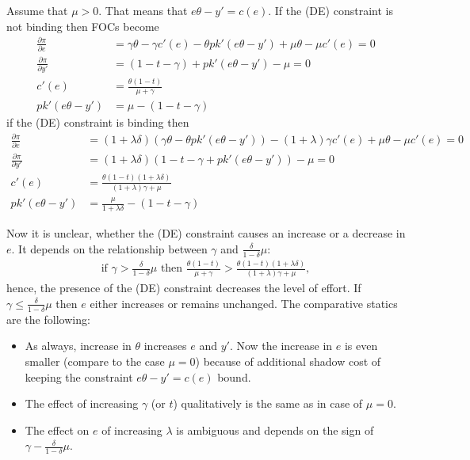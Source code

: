 \documentclass[a4paper]{article}
\begin{document}
Assume that $\mu > 0$. That means that $e\theta - y' = c(e)$. If the (DE) constraint is not binding then FOCs become
\begin{align*}
\frac{\partial \pi}{\partial e} &= \gamma \theta- \gamma c'(e) - \theta p k'(e \theta - y') + \mu \theta - \mu c'(e) = 0\\
\frac{\partial \pi}{\partial y'} &= (1 - t - \gamma)+pk'(e\theta - y') - \mu  = 0\\
c'(e) &= \frac{\theta(1 - t)}{\mu + \gamma}\\
pk'(e\theta - y') &= \mu - (1 - t - \gamma)
\end{align*}
if the (DE) constraint is binding then 
\begin{align*}
\frac{\partial \pi}{\partial e} &= (1 + \lambda \delta)(\gamma \theta - \theta p k'(e \theta - y')) - (1+\lambda) \gamma c'(e)+ \mu \theta - \mu c'(e) = 0\\
\frac{\partial \pi}{\partial y'} &= (1+\lambda \delta)(1 - t - \gamma+pk'(e\theta - y')) - \mu = 0\\
c'(e) &= \frac{\theta(1-t)(1+\lambda \delta)}{(1 + \lambda)\gamma + \mu}\\
pk'(e\theta - y') &= \frac{\mu}{1+\lambda \delta} - (1 - t- \gamma)
\end{align*}

Now it is unclear, whether the (DE) constraint causes an increase or a decrease in $e$. It depends on the relationship between $\gamma$ and $\frac{\delta}{1-\delta} \mu$: 
\begin{align*}
\text{if } \gamma > \frac{\delta}{1-\delta}\mu \text{  then  } \frac{\theta(1-t)}{\mu + \gamma} > \frac{\theta(1-t)(1 + \lambda \delta)}{(1 + \lambda)\gamma + \mu},
\end{align*} hence, the presence of the (DE) constraint decreases the level of effort. If $\gamma \le \frac{\delta}{1-\delta}\mu$ then $e$ either increases or remains unchanged.
The comparative statics are the following:
\begin{itemize}
	\item As always, increase in $\theta$ increases $e$ and $y'$. Now the increase in $e$ is even smaller (compare to the case $\mu = 0$) because of additional shadow cost of keeping the constraint $e\theta - y' = c(e)$ bound. 
	\item The effect of increasing $\gamma$ (or $t$) qualitatively is the same as in case of $\mu = 0$.
	\item The effect on $e$ of increasing $\lambda$ is ambiguous and depends on the sign of $\gamma - \frac{\delta}{1-\delta}\mu$.
\end{itemize}
\end{document}

